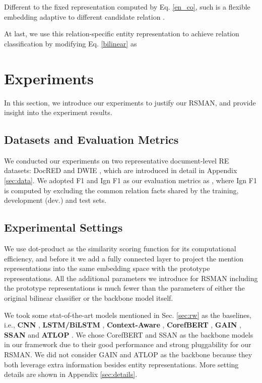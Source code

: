 \documentclass[11pt]{article}
\begin{document}
Different to the fixed representation computed by Eq. \ref{en_co}, such  is a flexible embedding adaptive to different candidate relation .

At last, we use this relation-specific entity representation to achieve relation classification by modifying Eq. \ref{bilinear} as



\section{Experiments}
In this section, we introduce our experiments to justify our RSMAN, and provide insight into the experiment results.

\subsection{Datasets and Evaluation Metrics}
We conducted our experiments on two representative document-level RE datasets: DocRED \cite{yao-etal-2019-docred} and DWIE \cite{zaporojets2021dwie}, which are introduced in detail in Appendix \ref{sec:data}. We adopted F1 and Ign F1 as our evaluation metrics as \cite{yao-etal-2019-docred}, where Ign F1 is computed by excluding the common relation facts shared by the training, development (dev.) and test sets.

\subsection{Experimental Settings}
We use dot-product as the similarity scoring function for its computational efficiency, and before it we add a fully
connected layer to project the mention representations into the same embedding space with the prototype representations. All the additional parameters we introduce for RSMAN including the prototype representations is much fewer than the parameters of either the original bilinear classifier or the backbone model itself.

We took some stat-of-the-art models mentioned in Sec. \ref{sec:rw} as the baselines, i.e., \textbf{CNN} \cite{zeng2014relation}, \textbf{LSTM/BiLSTM} \cite{cai-etal-2016-bidirectional}, \textbf{Context-Aware} \cite{sorokin-gurevych-2017-context}, \textbf{CorefBERT} \cite{ye-etal-2020-coreferential}, \textbf{GAIN} \cite{zeng-etal-2020-double}, \textbf{SSAN} \cite{xu2021entity} and \textbf{ATLOP} \cite{zhou2021document}. We chose CorefBERT and SSAN as the backbone models in our framework due to their good performance and strong pluggability for our RSMAN. We did not consider GAIN and ATLOP as the backbone because they both leverage extra information besides entity representations. More setting details are shown in Appendix \ref{sec:details}.
\end{document}
